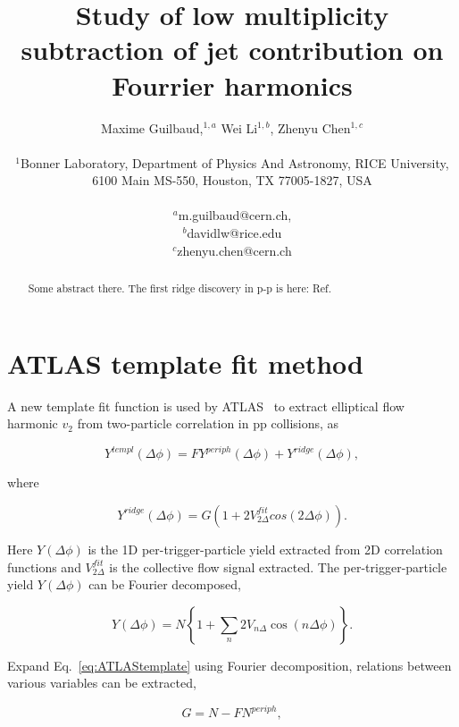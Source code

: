 \documentclass[12pt]{article}
\title{Study of low multiplicity subtraction of jet contribution on Fourrier harmonics}
\author
{Maxime Guilbaud,$^{1,a}$ Wei Li$^{1,b}$, Zhenyu Chen$^{1,c}$\\
\\
\normalsize{$^{1}$Bonner Laboratory, Department of Physics And Astronomy, RICE University,}\\
\normalsize{6100 Main MS-550, Houston, TX 77005-1827, USA}\\
\\
\normalsize{$^{a}$m.guilbaud@cern.ch, }\\
\normalsize{$^{b}$davidlw@rice.edu}\\
\normalsize{$^{c}$zhenyu.chen@cern.ch}\\
}
\date{}
\begin{document}
 


\baselineskip24pt


\maketitle 


\begin{abstract}

Some abstract there. The first ridge discovery in p-p is here: Ref.~\cite{Khachatryan:2010gv}

\end{abstract}


\section{ATLAS template fit method}

A new template fit function is used by ATLAS~\cite{Aad:2015gqa} to extract elliptical flow harmonic $v_{2}$ from two-particle correlation in pp collisions, as 

\begin{equation}
\label{eq:ATLAStemplate}
Y^{templ}(\Delta\phi) = F Y^{periph}(\Delta\phi) + Y^{ridge}(\Delta\phi),
\end{equation}

where

\begin{equation}
\label{eq:ATLAStemplateridge}
Y^{ridge}(\Delta\phi) = G(1+2V_{2\Delta}^{fit}cos(2\Delta\phi)).
\end{equation}

Here $Y(\Delta\phi)$ is the 1D per-trigger-particle yield extracted from 2D correlation functions and 
$V_{2\Delta}^{fit}$ is the collective flow signal extracted.
The per-trigger-particle yield $Y(\Delta\phi)$ can be Fourier decomposed,

\begin{equation}
\label{eq:ATLASyieldVn}
Y(\Delta\phi)  = N \left\{1+\sum\limits_{n} 2V_{n\Delta} \cos (n\Delta\phi)\right\}.
\end{equation}

Expand Eq.~\ref{eq:ATLAStemplate} using Fourier decomposition, relations between various variables can be extracted,

\begin{equation}
\label{eq:ATLASfit1}
G = N - FN^{periph},
\end{equation}
\end{document}

